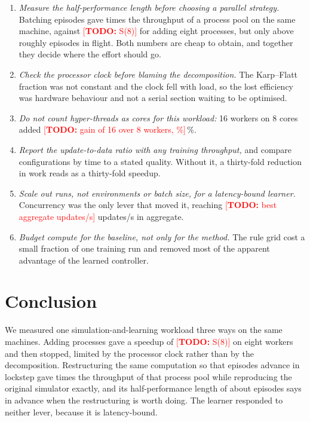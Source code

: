 \documentclass[conference]{IEEEtran}
\newcommand{\TODO}[1]{\textcolor{red}{[\textbf{TODO:} #1]}}
\providecommand{\NumSpeedEight}{\TODO{S(8)}}
\providecommand{\NumSmtGain}{\TODO{gain of 16 over 8 workers, \%}}
\providecommand{\NumMultiBest}{\TODO{best aggregate updates/s}}
\begin{document}
\begin{enumerate}
  \item \emph{Measure the half-performance length before choosing a parallel strategy.} Batching episodes gave
        \NumBatchGridSpeedup{} times the throughput of a process pool on the same machine, against \NumSpeedEight{}
        for adding eight processes, but only above roughly \NumBatchNHalf{} episodes in flight. Both numbers are
        cheap to obtain, and together they decide where the effort should go.
  \item \emph{Check the processor clock before blaming the decomposition.} The Karp--Flatt fraction was not
        constant and the clock fell with load, so the lost efficiency was hardware behaviour and not a serial
        section waiting to be optimised.
  \item \emph{Do not count hyper-threads as cores for this workload:} 16 workers on 8 cores added \NumSmtGain\,\%.
  \item \emph{Report the update-to-data ratio with any training throughput,} and compare configurations by time to
        a stated quality. Without it, a thirty-fold reduction in work reads as a thirty-fold speedup.
  \item \emph{Scale out runs, not environments or batch size, for a latency-bound learner.} Concurrency was the
        only lever that moved it, reaching \NumMultiBest{} updates/s in aggregate.
  \item \emph{Budget compute for the baseline, not only for the method.} The rule grid cost a small fraction of one
        training run and removed most of the apparent advantage of the learned controller.
\end{enumerate}

\section{Conclusion}
We measured one simulation-and-learning workload three ways on the same machines. Adding processes gave a speedup
of \NumSpeedEight{} on eight workers and then stopped, limited by the processor clock rather than by the
decomposition. Restructuring the same computation so that episodes advance in lockstep gave \NumBatchGridSpeedup{}
times the throughput of that process pool while reproducing the original simulator exactly, and its
half-performance length of about \NumBatchNHalf{} episodes says in advance when the restructuring is worth doing.
The learner responded to neither lever, because it is latency-bound.
\end{document}
